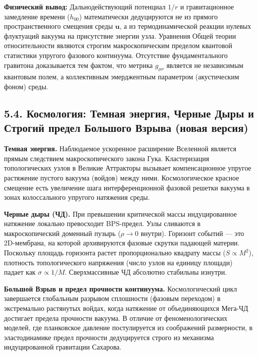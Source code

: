 \documentclass[11pt,a4paper]{article}
\begin{document}
	\textbf{Физический вывод:} Дальнодействующий потенциал $1/r$ и гравитационное замедление времени ($h_{00}$) математически дедуцируются не из прямого пространственного смещения среды $\mathbf{u}$, а из термодинамической реакции нулевых флуктуаций вакуума на присутствие энергии узла. Уравнения Общей теории относительности являются строгим макроскопическим пределом квантовой статистики упругого фазового континуума. Отсутствие фундаментального гравитона доказывается тем фактом, что метрика $g_{\mu\nu}$ является не независимым квантовым полем, а коллективным эмерджентным параметром (акустическим фоном) среды.
	
	\subsection{5.4. Космология: Темная энергия, Черные Дыры и Строгий предел Большого Взрыва (новая версия)}
	\textbf{Темная энергия.} Наблюдаемое ускоренное расширение Вселенной является прямым следствием макроскопического закона Гука. Кластеризация топологических узлов в Великие Аттракторы вызывает компенсационное упругое растяжение пустого вакуума (войдов) между ними. Космологическое красное смещение есть увеличение шага интерференционной фазовой решетки вакуума в зонах колоссального упругого натяжения среды.
	
	\textbf{Черные дыры (ЧД).} При превышении критической массы индуцированное натяжение локально превосходит BPS-предел. Узлы сливаются в макроскопический доменный пузырь ($\rho \to 0$ внутри). Горизонт событий — это 2D-мембрана, на которой архивируются фазовые скрутки падающей материи. Поскольку площадь горизонта растет пропорционально квадрату массы ($S \propto M^2$), плотность топологического напряжения (число узлов на единицу площади) падает как $\sigma \propto 1/M$. Сверхмассивные ЧД абсолютно стабильны изнутри.
	
	\textbf{Большой Взрыв и предел прочности континуума.} 
	Космологический цикл завершается глобальным разрывом сплошности (фазовым переходом) в экстремально растянутых войдах, когда натяжение от объединяющихся Мега-ЧД достигает предела прочности вакуума. В отличие от феноменологических моделей, где планковское давление постулируется из соображений размерности, в эластодинамике предел прочности дедуцируется строго из механизма индуцированной гравитации Сахарова.
	
\end{document}
